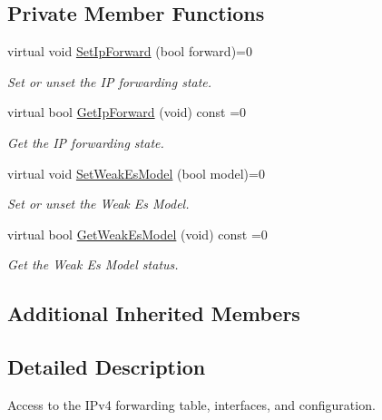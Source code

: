 \subsection*{Private Member Functions}
\begin{DoxyCompactItemize}
\item 
virtual void \hyperlink{classns3_1_1Ipv4_a12decc8332283f56ba59b0aacb3498ca}{Set\+Ip\+Forward} (bool forward)=0
\begin{DoxyCompactList}\small\item\em Set or unset the IP forwarding state. \end{DoxyCompactList}\item 
virtual bool \hyperlink{classns3_1_1Ipv4_ac6803a68ed412d4aae3108afc2afd890}{Get\+Ip\+Forward} (void) const =0
\begin{DoxyCompactList}\small\item\em Get the IP forwarding state. \end{DoxyCompactList}\item 
virtual void \hyperlink{classns3_1_1Ipv4_a3bdaf12fbfaca276c1a60a3a7cd9b68c}{Set\+Weak\+Es\+Model} (bool model)=0
\begin{DoxyCompactList}\small\item\em Set or unset the Weak Es Model. \end{DoxyCompactList}\item 
virtual bool \hyperlink{classns3_1_1Ipv4_a3d9882e80ef4e0e2375d89037f3ab5e1}{Get\+Weak\+Es\+Model} (void) const =0
\begin{DoxyCompactList}\small\item\em Get the Weak Es Model status. \end{DoxyCompactList}\end{DoxyCompactItemize}
\subsection*{Additional Inherited Members}


\subsection{Detailed Description}
Access to the I\+Pv4 forwarding table, interfaces, and configuration. 


